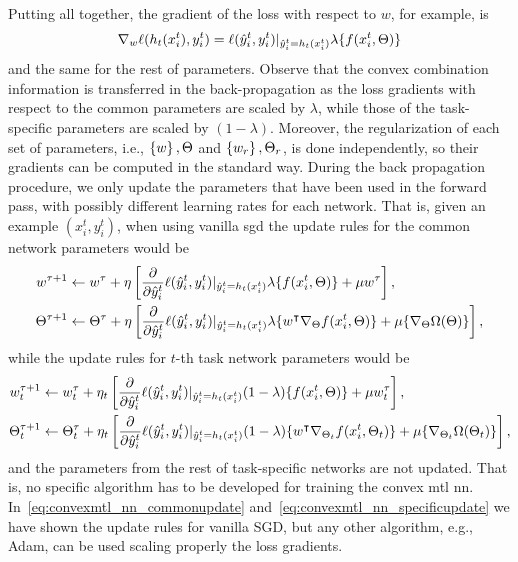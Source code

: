 Putting all together, the gradient of the loss with respect to $w$, for example, is 
$$  \nabla_w \ell(h_t(x_i^t), y_i^t)  =\ell(\hat{y}_i^t, y_i^t) \vert_{\hat{y}_i^t = h_t(x_i^t)} \lambda \lbrace f(x_i^t, \Theta) \rbrace $$
and the same for the rest of parameters.
%
Observe that the convex combination information is transferred in the back-propagation as the loss gradients with respect to the common parameters are scaled by $\lambda$, while those of the task-specific parameters are scaled by $(1 - \lambda)$.
%
Moreover, the regularization of each set of parameters, i.e., $\left\{w\right\}, \Theta$ and $\left\{w_r\right\}, \Theta_r$, is done independently, so their gradients can be computed in the standard way.
%
During the back propagation procedure, we only update the parameters that have been used in the forward pass, with possibly different learning rates for each network. 
That is, given an example $(x_i^t, y_i^t)$, when using vanilla \acrfull{sgd} the update rules for the common network parameters would be
\begin{equation}\label{eq:convexmtl_nn_commonupdate}
    \begin{aligned}
        w^{\tau + 1} &\gets w^\tau + \eta \left[  \frac{\partial}{\partial \hat{y}_i^t}  \lossf(\hat{y}_i^t, y_i^t) \vert_{\hat{y}_i^t = h_t(x_i^t)} \lambda \lbrace f(x_i^t, \Theta) \rbrace + \mu w^\tau \right], \\
        \Theta^{\tau + 1} &\gets \Theta^\tau + \eta \left[ \frac{\partial}{\partial \hat{y}_i^t}  \lossf(\hat{y}_i^t, y_i^t) \vert_{\hat{y}_i^t = h_t(x_i^t)}  \lambda \lbrace w^\intercal \nabla_\Theta f(x_i^t, \Theta)\rbrace + \mu \lbrace \nabla_\Theta \Omega( \Theta)  \rbrace \right],
    \end{aligned}
\end{equation}
while the update rules for $t$-th task network parameters would be
\begin{equation}\label{eq:convexmtl_nn_specificupdate}
    \begin{aligned}
        w_t^{\tau + 1} &\gets w_t^\tau + \eta_t \left[  \frac{\partial}{\partial \hat{y}_i^t}  \lossf(\hat{y}_i^t, y_i^t) \vert_{\hat{y}_i^t = h_t(x_i^t)} (1 - \lambda) \lbrace f(x_i^t, \Theta) \rbrace + \mu w_t^\tau \right], \\
        \Theta_t^{\tau + 1} &\gets \Theta_t^\tau + \eta_t \left[ \frac{\partial}{\partial \hat{y}_i^t}  \lossf(\hat{y}_i^t, y_i^t) \vert_{\hat{y}_i^t = h_t(x_i^t)}  (1 - \lambda) \lbrace w^\intercal \nabla_{\Theta_t} f(x_i^t, \Theta_t)\rbrace + \mu \lbrace \nabla_{\Theta_t} \Omega( \Theta_t) \rbrace \right],
    \end{aligned}
\end{equation}
and the parameters from the rest of task-specific networks are not updated.
%
That is, no specific algorithm has to be developed for training the convex \acrshort{mtl} \acrshort{nn}. In~\eqref{eq:convexmtl_nn_commonupdate} and~\eqref{eq:convexmtl_nn_specificupdate} we have shown the update rules for vanilla SGD, but any other algorithm, e.g., Adam, can be used scaling properly the loss gradients.

